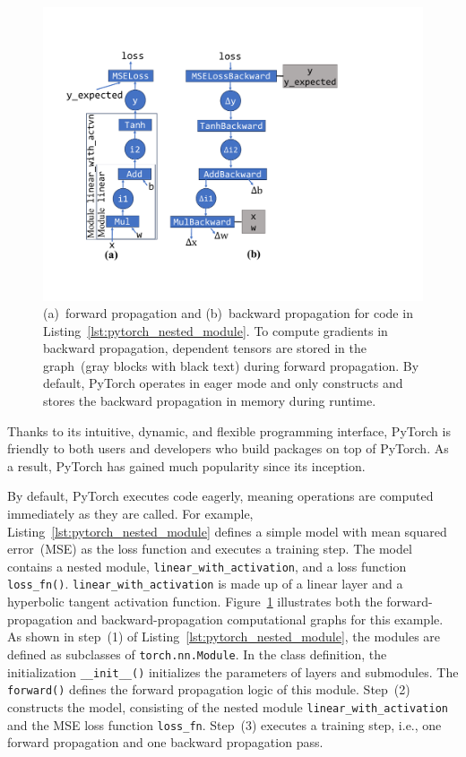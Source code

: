 \begin{figure}[]
    \centering
    \includegraphics[width=0.65\linewidth]{figures/Intro/pytorch_graph_with_gradients.pdf}
    \caption{ (a)~forward propagation and (b)~backward propagation  for code in Listing~\ref{lst:pytorch_nested_module}. To compute gradients in backward propagation, dependent tensors are stored in the graph~(gray blocks with black text) during forward propagation. By default, PyTorch operates in eager mode and only constructs and stores the  backward propagation in memory during runtime. }
    \label{fig:pytorch_graph}
\end{figure}
Thanks to its intuitive, dynamic, and flexible programming interface, PyTorch is friendly to both users and developers who build packages on top of PyTorch. As a result, PyTorch has gained much popularity since its inception. 

By default, PyTorch executes code eagerly, meaning operations are computed immediately as they are called. For example, Listing~\ref{lst:pytorch_nested_module} defines a simple  model with mean squared error~(MSE) as the loss function and executes a training step.  The model contains a nested module, \texttt{linear\_with\_activation}, and a loss function \texttt{loss\_fn()}. \texttt{linear\_with\_activation} is made up of a linear layer and a hyperbolic tangent activation function. Figure~\ref{fig:pytorch_graph} illustrates both the forward-propagation and backward-propagation computational graphs for this example. As shown in step~(1) of Listing~\ref{lst:pytorch_nested_module}, the modules are defined as subclasses of \texttt{torch.nn.Module}. In the class definition, the initialization  \texttt{\_\_init\_\_()} initializes the parameters of layers and submodules. The  \texttt{forward()} defines the forward propagation logic of this module. Step~(2) constructs the model, consisting of the nested module \texttt{linear\_with\_activation} and the MSE loss function \texttt{loss\_fn}. Step~(3) executes a training step, i.e., one forward propagation and one backward propagation pass. 


